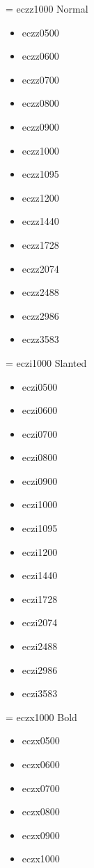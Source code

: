 \documentclass{amsart}
\begin{document}
\bigskip
\noindent
\parbox[t]{0.25\textwidth}{
\font\temp = eczz1000 \temp
Normal
\begin{itemize}
\item \textsf{eczz0500}
\item \textsf{eczz0600}
\item \textsf{eczz0700}
\item \textsf{eczz0800}
\item \textsf{eczz0900}
\item \textsf{eczz1000}
\item \textsf{eczz1095}
\item \textsf{eczz1200}
\item \textsf{eczz1440}
\item \textsf{eczz1728}
\item \textsf{eczz2074}
\item \textsf{eczz2488}
\item \textsf{eczz2986}
\item \textsf{eczz3583}
\end{itemize}
}\parbox[t]{0.25\textwidth}{
\font\temp = eczi1000 \temp
Slanted
\begin{itemize}
\item \textsf{eczi0500}
\item \textsf{eczi0600}
\item \textsf{eczi0700}
\item \textsf{eczi0800}
\item \textsf{eczi0900}
\item \textsf{eczi1000}
\item \textsf{eczi1095}
\item \textsf{eczi1200}
\item \textsf{eczi1440}
\item \textsf{eczi1728}
\item \textsf{eczi2074}
\item \textsf{eczi2488}
\item \textsf{eczi2986}
\item \textsf{eczi3583}
\end{itemize}
}\parbox[t]{0.25\textwidth}{
\font\temp = eczx1000 \temp
Bold
\begin{itemize}
\item \textsf{eczx0500}
\item \textsf{eczx0600}
\item \textsf{eczx0700}
\item \textsf{eczx0800}
\item \textsf{eczx0900}
\item \textsf{eczx1000}

\end{itemize}}
\end{document}
